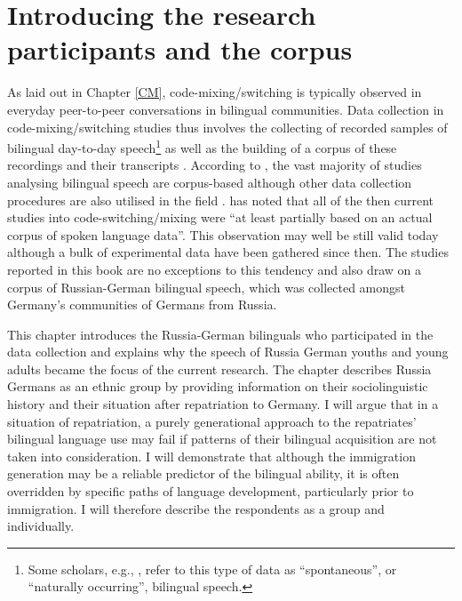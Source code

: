 \chapter{Introducing the research participants and the corpus}\label{RuDe}

As laid out in Chapter \ref{CM}, code-mixing/switching is typically observed in everyday peer-to-peer conversations in bilingual communities. Data collection in code-mixing/switching studies thus involves the collecting of recorded samples of bilingual day-to-day speech\footnote{Some scholars, e.g., \citet{torres-travis}, refer to this type of data as “spontaneous”, or “naturally occurring”, bilingual speech.} as well as the building of a corpus of these recordings and their transcripts \citep[cf.][]{adamou-16}. According to \citet[][42]{backus-two-1996}, the vast majority of studies analysing bilingual speech are corpus-based although other data collection procedures are also utilised in the field \citep[see e.g.,][]{kootstra-etal12,bullock-toribio-gullberg-etal}. \citet[][42]{backus-two-1996} has noted that all of the then current studies into code-switching/mixing were ``at least partially based on an actual corpus of spoken language data''. This observation may well be still valid today although a bulk of experimental data have been gathered since then. The studies reported in this book are no exceptions to this tendency and also draw on a corpus of Russian-German bilingual speech, which was collected amongst Germany's communities of Germans from Russia. 

This chapter introduces the Russia-German bilinguals who participated in the data collection and explains why the speech of Russia German youths and young adults became the focus of the current research. The chapter describes Russia Germans as an ethnic group by providing information on their sociolinguistic history and their situation after repatriation to Germany. I will argue that in a situation of repatriation, a purely generational approach to the repatriates' bilingual language use may fail if patterns of their bilingual acquisition are not taken into consideration. I will demonstrate that although the immigration generation may be a reliable predictor of the bilingual ability, it is often overridden by specific paths of language development, particularly prior to immigration. I will therefore describe the respondents as a group and individually. 

